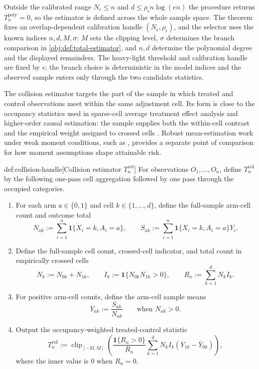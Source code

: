 \documentclass[11pt]{article}
\begin{document}
Outside the calibrated range \(N_{\epsilon}\le n\) and \(d\le\rho_{\epsilon}n\log(en)\) the procedure returns \(T_n^{\mathrm{poly}}=0\), so the estimator is defined across the whole sample space. The theorem fixes an overlap-dependent calibration handle \((N_\epsilon,\rho_\epsilon)\), and the selector uses the known indices \(n,d,M,\sigma\): \(M\) sets the clipping level, \(\sigma\) determines the branch comparison in \cref{obj:def:total-estimator}, and \(n,d\) determine the polynomial degree and the displayed remainders. The heavy-light threshold and calibration handle are fixed by \(\epsilon\); the branch choice is deterministic in the model indices and the observed sample enters only through the two candidate statistics.

The collision estimator targets the part of the sample in which treated and control observations meet within the same adjustment cell. Its form is close to the occupancy statistics used in sparse-cell average treatment effect analysis and higher-order causal estimation: the sample supplies both the within-cell contrast and the empirical weight assigned to crossed cells \citep{Robins2008,Robins2017}. Robust mean-estimation work under weak moment conditions, such as \citet{LugosiMendelson2019}, provides a separate point of comparison for how moment assumptions shape attainable risk.

\begin{algorithmv}{def:collision-handle}[Collision estimator \(T_n^{\mathrm{col}}\)]
For observations \(O_1,\ldots,O_n\), define \(T_n^{\mathrm{col}}\) by the following one-pass cell aggregation followed by one pass through the occupied categories.

\begin{enumerate}
\item For each arm \(a\in\{0,1\}\) and cell \(k\in\{1,\ldots,d\}\), define the full-sample arm-cell count and outcome total
\[
N_{ak}
:=
\sum_{i=1}^n\mathbf 1\{X_i=k,A_i=a\},
\qquad
S_{ak}
:=
\sum_{i=1}^n\mathbf 1\{X_i=k,A_i=a\}Y_i.
\]

\item Define the full-sample cell count, crossed-cell indicator, and total count in empirically crossed cells
\[
N_k:=N_{0k}+N_{1k},
\qquad
I_k:=\mathbf 1\{N_{0k}N_{1k}>0\},
\qquad
R_n:=\sum_{k=1}^d N_k I_k.
\]

\item For positive arm-cell counts, define the arm-cell sample means
\[
\overline Y_{ak}:=\frac{S_{ak}}{N_{ak}}
\qquad\text{when }N_{ak}>0.
\]

\item Output the occupancy-weighted treated-control statistic
\[
T_n^{\mathrm{col}}
:=
\operatorname{clip}_{[-M,M]}
\left(
\frac{\mathbf 1\{R_n>0\}}{R_n}
\sum_{k=1}^d
N_kI_k(\overline Y_{1k}-\overline Y_{0k})
\right),
\]
where the inner value is \(0\) when \(R_n=0\).
\end{enumerate}
\end{algorithmv}
\end{document}

